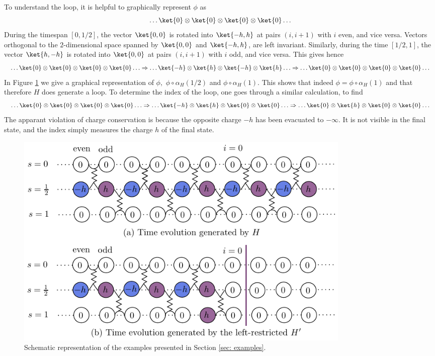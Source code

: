 To understand the loop, it is helpful to graphically represent $ \phi$ as 
$$
\ldots \ket{0} \otimes \ket{0}\otimes \ket{0} \otimes \ket{0}  \ldots 
$$
During the timespan $ [0,1/2]$, the vector $\ket{0,0}$ is rotated into $\ket{-h,h}$ at pairs $(i,i+1)$ with $i$ even, and vice versa. Vectors orthogonal to the $2$-dimensional space spanned by $\ket{0,0}$ and $\ket{-h,h}$, are left invariant. 
Similarly, during the time $ [1/2,1]$, the vector  $\ket{h,-h}$ is rotated into $\ket{0,0}$ at pairs $(i,i+1)$ with $i$ odd, and vice versa.
This gives hence
$$
\ldots \ket{0} \otimes \ket{0}\otimes \ket{0} \otimes \ket{0} \ldots  \Rightarrow   \ldots \ket{-h} \otimes \ket{h}\otimes \ket{-h} \otimes \ket{h} 
\ldots  \Rightarrow \ldots
\ket{0} \otimes \ket{0}\otimes \ket{0} \otimes \ket{0} \ldots
$$
In Figure \ref{fig:ExampleLoop} we give a graphical representation of $\phi,$ $\phi\circ\alpha_H(1/2)$ and $\phi\circ\alpha_H(1)$. This shows that indeed $\phi=\phi\circ\alpha_H(1)$ and that therefore $H$ does generate a loop. To determine the index of the loop, one goes through a similar calculation, to find
$$
\ldots \ket{0} \otimes \ket{0}\otimes \ket{0} \otimes \ket{0} \ldots \Rightarrow \ldots \ket{-h} \otimes \ket{h}\otimes \ket{0} \otimes \ket{0} 
\ldots \Rightarrow \ldots
\ket{0} \otimes \ket{h}\otimes \ket{0} \otimes \ket{0} \ldots 
$$
The apparant violation of charge conservation is because the opposite charge $-h$ has been evacuated to $-\infty$. It is not visible in the final state, and the index simply measures the charge $h$ of the final state.

\begin{figure}[ht] 
	\begin{center}
		\includegraphics[width=0.8\textwidth]{chapters/LoopSPT/image/Example.pdf}
		\caption{Schematic representation of the examples presented in Section \ref{sec: examples}.}
		\label{fig:ExampleLoop}
	\end{center}
\end{figure}

